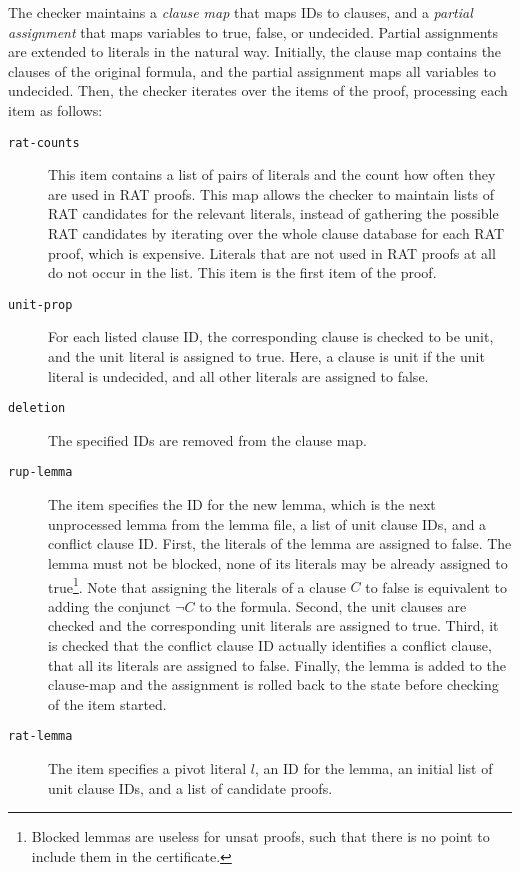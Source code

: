 \documentclass[smallcondensed]{svjour3}     %
\begin{document}
The checker maintains a \emph{clause map} that maps IDs to clauses, and a \emph{partial assignment} that maps variables to true, false, or undecided. 
Partial assignments are extended to literals in the natural way.
Initially, the clause map contains the clauses of the original formula, and the partial assignment maps all variables to undecided.
Then, the checker iterates over the items of the proof, processing each item as follows:
\begin{description}
  \item[\tt rat-counts] This item contains a list of pairs of literals and the count how often they are used in RAT proofs. 
      This map allows the checker to maintain lists of RAT candidates for the relevant literals, instead of gathering the 
      possible RAT candidates by iterating over the whole clause database for each RAT proof, which is expensive.
      Literals that are not used in RAT proofs at all do not occur in the list. This item is the first item of the proof.
  \item[\tt unit-prop] 
    For each listed clause ID, the corresponding clause is checked to be unit, and the unit literal is assigned to true.
    Here, a clause is unit if the unit literal is undecided, and all other literals are assigned to false.
  \item[\tt deletion] The specified IDs are removed from the clause map.
  \item[\tt rup-lemma] The item specifies the ID for the new lemma, which is the next unprocessed lemma from the lemma file, a list of unit clause IDs, and a conflict clause ID.
      First, the literals of the lemma are assigned to false. The lemma must not be blocked, \ie none of its literals may be already assigned to true\footnote{Blocked lemmas are useless for unsat proofs, such that there is no point to include them in the certificate.}.
        Note that assigning the literals of a clause $C$ to false is equivalent to adding the conjunct $\neg C$ to the formula. 
      Second, the unit clauses are checked and the corresponding unit literals are assigned to true.
      Third, it is checked that the conflict clause ID actually identifies a conflict clause, \ie that all its literals are assigned to false.
      Finally, the lemma is added to the clause-map and the assignment is rolled back to the state before checking of the item started.
    \item[\tt rat-lemma] The item specifies a pivot literal $l$, an ID for the lemma, an initial list of unit clause IDs, and a list of
      candidate proofs. 

\end{description}
\end{document}
